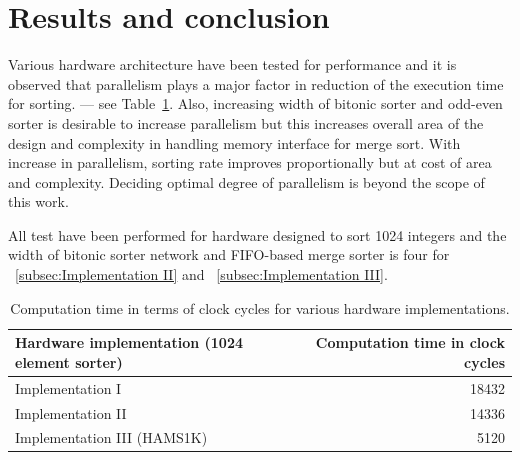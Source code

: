 \documentclass{article}
\begin{document}
\section{Results and conclusion}

Various hardware architecture have been tested for performance and it is observed that parallelism plays a major factor in reduction of the execution time for sorting.  --- see Table~\ref{tab:widgets}. Also, increasing width of bitonic sorter and odd-even sorter is desirable to increase parallelism but this increases overall area of the design and complexity in handling memory interface for merge sort. With  increase in parallelism, sorting rate improves proportionally but at cost of area and complexity.
Deciding optimal degree of parallelism is beyond the scope of this work.

All test have been performed for hardware designed to sort 1024 integers and the width of bitonic sorter network and FIFO-based merge sorter is four for ~\ref{subsec:Implementation II} and ~\ref{subsec:Implementation III}. 
\begin{table}[H]
\centering
\begin{tabular}{l|r}
Hardware implementation (1024 element sorter) & Computation time in clock cycles \\\hline
Implementation I & 18432 \\
Implementation II & 14336 \\
Implementation III (HAMS1K) & 5120
\end{tabular}
\caption{\label{tab:widgets}Computation time in terms of clock cycles for various hardware implementations.}
\end{table}



\end{document}

